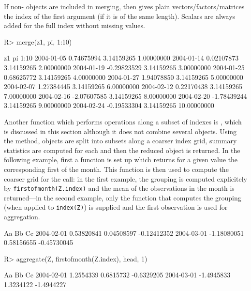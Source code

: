 \documentclass{Z}
\begin{document}
If non- objects are included in merging,
then  gives plain vectors/factors/matrices the index of the
first argument (if it is of the same length). Scalars are always added for
the full index without missing values.

\begin{Schunk}
\begin{Sinput}
R> merge(z1, pi, 1:10)
\end{Sinput}
\begin{Soutput}
           z1          pi          1:10       
2004-01-05  0.74675994  3.14159265  1.00000000
2004-01-14  0.02107873  3.14159265  2.00000000
2004-01-19 -0.29823529  3.14159265  3.00000000
2004-01-25  0.68625772  3.14159265  4.00000000
2004-01-27  1.94078850  3.14159265  5.00000000
2004-02-07  1.27384445  3.14159265  6.00000000
2004-02-12  0.22170438  3.14159265  7.00000000
2004-02-16 -2.07607585  3.14159265  8.00000000
2004-02-20 -1.78439244  3.14159265  9.00000000
2004-02-24 -0.19533304  3.14159265 10.00000000
\end{Soutput}
\end{Schunk}

Another function which performs operations along a subset of indexes
is , which is discussed in this section although
it does not combine several objects. Using the  method,  objects
are split into subsets along a coarser index grid,
summary statistics are computed for each and then the 
reduced object is returned. In the following example,
first a function is set up which returns for a given 
value the corresponding first of the month. This function is then
used to compute the coarser grid for the  call: in
the first example, the grouping is computed explicitely by \verb/firstofmonth(Z.index)/
and the mean of the observations in the month
is returned---in the second example, only the function that computes 
the grouping (when applied to \verb/index(Z)/) is supplied and
the first observation is used for aggregation.

\begin{Schunk}
\begin{Soutput}
           Aa          Bb          Cc         
2004-02-01  0.53820841  0.04508597 -0.12412352
2004-03-01 -1.18080051  0.58156655 -0.45730045
\end{Soutput}
\begin{Sinput}
R> aggregate(Z, firstofmonth(Z.index), head, 1)
\end{Sinput}
\begin{Soutput}
           Aa         Bb         Cc        
2004-02-01  1.2554339  0.6815732 -0.6329205
2004-03-01 -1.4945833  1.3234122 -1.4944227
\end{Soutput}
\end{Schunk}
\end{document}
